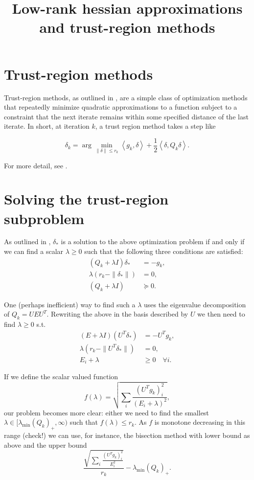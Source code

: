 \documentclass[10pt]{article}
\begin{document}
\title{Low-rank hessian approximations and trust-region methods} 
\author{}
\date{}
\maketitle

\section{Trust-region methods}
Trust-region methods, as outlined in \cite[p.66]{nw}, are a simple class of optimization methods that repeatedly minimize quadratic approximations to a function subject to a constraint that the next iterate remains within some specified distance of the last iterate. In short, at iteration $k$, a trust region method takes a step like 

$$\delta_{k} = \arg\min_{\|\delta\| \le r_k} \left<g_k,\delta \right> + \frac{1}{2}\left<\delta, Q_k\delta\right>.$$ 

For more detail, see \cite[p.66]{nw}.

\section{Solving the trust-region subproblem}
As outlined in \cite[Theorem 4.1]{nw}, $\delta_*$ is a solution to the above optimization problem if and only if we can find a scalar $\lambda \ge 0$ such that the following three conditions are satisfied:
\begin{align*}
(Q_k + \lambda I)\delta_* &= -g_k, \\
\lambda(r_k - \|\delta_* \|) &= 0, \\
(Q_k + \lambda I) &\succeq 0.
\end{align*}

One (perhaps inefficient) way to find such a $\lambda$ uses the eigenvalue decomposition of $Q_k = UEU^{T}$. Rewriting the above in the basis described by $U$ we then need to find $\lambda \ge 0$ s.t. 
\begin{align*}
(E + \lambda I)(U^T\delta_*) &= -U^Tg_k, \\
\lambda(r_k - \|U^T \delta_* \|) &= 0, \\
E_i + \lambda  &\ge 0 \quad \forall i.
\end{align*}

If we define the scalar valued function $$f(\lambda) = \sqrt{\sum_i \frac{(U^Tg_k)_i^2}{(E_i + \lambda)^2}},$$
our problem becomes more clear: either we need to find the smallest $\lambda \in [\lambda_{\textrm{min}}(Q_k)_+, \infty)$ such that $f(\lambda) \le r_k$. As $f$ is monotone decreasing in this range (check!) we can use, for instance, the bisection method with lower bound as above and the upper bound $$\frac{\sqrt{\sum_i \frac{(U^Tg_k)_i^2}{E_i ^2}}}{r_k} - \lambda_{\textrm{min}}(Q_k)_+.$$
\end{document}
